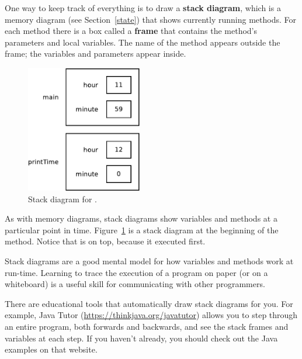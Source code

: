 One way to keep track of everything is to draw a {\bf stack diagram}, which is a memory diagram (see Section~\ref{state}) that shows currently running methods.
For each method there is a box called a {\bf frame} that contains the method's parameters and local variables.
The name of the method appears outside the frame; the variables and parameters appear inside.

\begin{figure}[!ht]
\begin{center}
\includegraphics[height=15em]{figs/stack1.pdf}
\caption{Stack diagram for .}
\label{fig.stack}
\end{center}
\end{figure}

As with memory diagrams, stack diagrams show variables and methods at a particular point in time.
Figure~\ref{fig.stack} is a stack diagram at the beginning of the  method.
Notice that  is on top, because it executed first.




Stack diagrams are a good mental model for how variables and methods work at run-time.
Learning to trace the execution of a program on paper (or on a whiteboard) is a useful skill for communicating with other programmers.

There are educational tools that automatically draw stack diagrams for you.
For example, Java Tutor (\url{https://thinkjava.org/javatutor}) allows you to step through an entire program, both forwards and backwards, and see the stack frames and variables at each step.
If you haven't already, you should check out the Java examples on that website.



